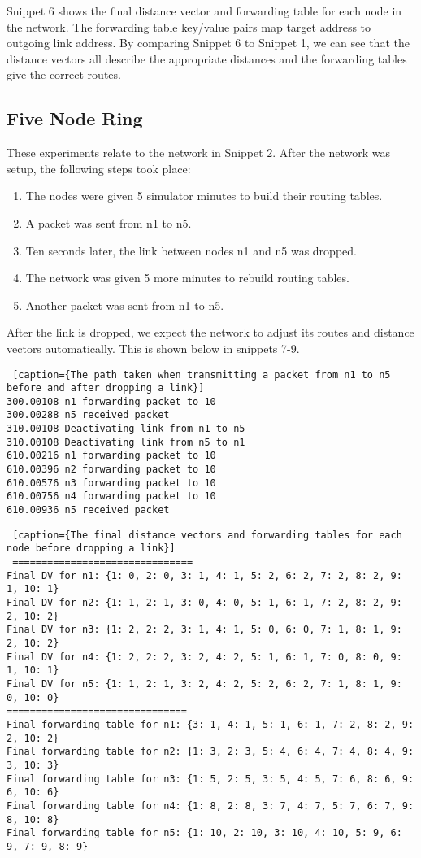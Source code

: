 \documentclass[11pt]{article}
\begin{document}
Snippet 6 shows the final distance vector and forwarding table for each node in the network. The forwarding table key/value pairs map target address to outgoing link address. By comparing Snippet 6 to Snippet 1, we can see that the distance vectors all describe the appropriate distances and the forwarding tables give the correct routes.

\subsection{Five Node Ring}

These experiments relate to the network in Snippet 2. After the network was setup, the following steps took place:

\begin{enumerate}
  \item The nodes were given 5 simulator minutes to build their routing tables.
  \item A packet was sent from n1 to n5.
  \item Ten seconds later, the link between nodes n1 and n5 was dropped.
  \item The network was given 5 more minutes to rebuild routing tables.
  \item Another packet was sent from n1 to n5.
\end{enumerate}

After the link is dropped, we expect the network to adjust its routes and distance vectors automatically. This is shown below in snippets 7-9.

 \begin{lstlisting} [caption={The path taken when transmitting a packet from n1 to n5 before and after dropping a link}]
300.00108 n1 forwarding packet to 10
300.00288 n5 received packet
310.00108 Deactivating link from n1 to n5
310.00108 Deactivating link from n5 to n1
610.00216 n1 forwarding packet to 10
610.00396 n2 forwarding packet to 10
610.00576 n3 forwarding packet to 10
610.00756 n4 forwarding packet to 10
610.00936 n5 received packet
\end{lstlisting}

 \begin{lstlisting} [caption={The final distance vectors and forwarding tables for each node before dropping a link}]
 ===============================
Final DV for n1: {1: 0, 2: 0, 3: 1, 4: 1, 5: 2, 6: 2, 7: 2, 8: 2, 9: 1, 10: 1}
Final DV for n2: {1: 1, 2: 1, 3: 0, 4: 0, 5: 1, 6: 1, 7: 2, 8: 2, 9: 2, 10: 2}
Final DV for n3: {1: 2, 2: 2, 3: 1, 4: 1, 5: 0, 6: 0, 7: 1, 8: 1, 9: 2, 10: 2}
Final DV for n4: {1: 2, 2: 2, 3: 2, 4: 2, 5: 1, 6: 1, 7: 0, 8: 0, 9: 1, 10: 1}
Final DV for n5: {1: 1, 2: 1, 3: 2, 4: 2, 5: 2, 6: 2, 7: 1, 8: 1, 9: 0, 10: 0}
===============================
Final forwarding table for n1: {3: 1, 4: 1, 5: 1, 6: 1, 7: 2, 8: 2, 9: 2, 10: 2}
Final forwarding table for n2: {1: 3, 2: 3, 5: 4, 6: 4, 7: 4, 8: 4, 9: 3, 10: 3}
Final forwarding table for n3: {1: 5, 2: 5, 3: 5, 4: 5, 7: 6, 8: 6, 9: 6, 10: 6}
Final forwarding table for n4: {1: 8, 2: 8, 3: 7, 4: 7, 5: 7, 6: 7, 9: 8, 10: 8}
Final forwarding table for n5: {1: 10, 2: 10, 3: 10, 4: 10, 5: 9, 6: 9, 7: 9, 8: 9}
\end{lstlisting}
\end{document}
